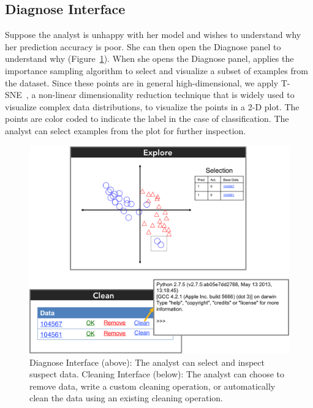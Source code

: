 \subsection{Diagnose Interface}
Suppose the analyst is unhappy with her model and wishes to understand why her prediction accuracy is poor.
She can then open the \textsf{Diagnose} panel to understand why (Figure~\ref{diag}).
When she opens the \textsf{Diagnose} panel, \sys applies the importance sampling algorithm to select and visualize a subset of examples from the dataset.
Since these points are in general high-dimensional, we apply T-SNE~\cite{van2008visualizing},
a non-linear dimensionality reduction technique that is widely used to visualize complex data distributions,
to visualize the points in a 2-D plot.
The points are color coded to indicate the label in the case of classification.
The analyst can select examples from the plot for further inspection.

\begin{figure}[t]
\centering
 \includegraphics[width=0.7\columnwidth]{figs/interface3.png}
 \caption{Diagnose Interface (above): The analyst can select and inspect suspect data. 
 Cleaning Interface (below): The analyst can choose to remove data, write a custom cleaning operation, or automatically clean the data using an existing cleaning operation.\label{diag}}
\end{figure}

